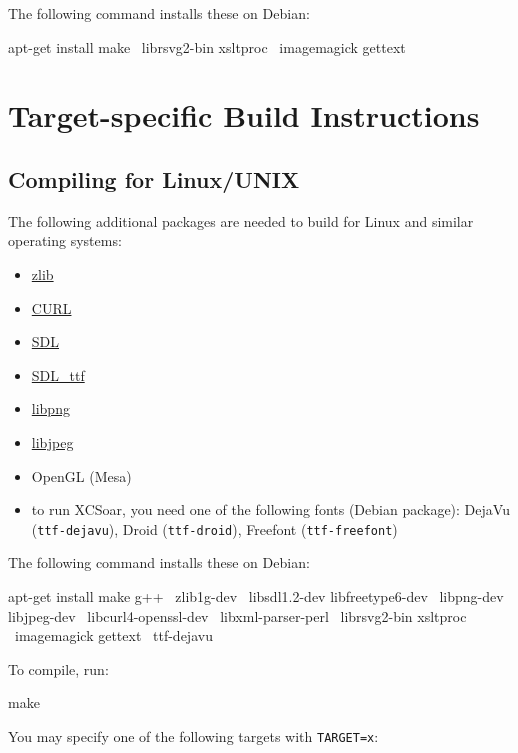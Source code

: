 The following command installs these on Debian:

\begin{verbatim*}
apt-get install make \
  librsvg2-bin xsltproc \
  imagemagick gettext
\end{verbatim*}

\section{Target-specific Build Instructions}

\subsection{Compiling for Linux/UNIX}

The following additional packages are needed to build for Linux and
similar operating systems:

\begin{itemize}
\item \href{http://www.zlib.net/}{zlib}
\item \href{http://curl.haxx.se/}{CURL}
\item \href{http://www.libsdl.org/}{SDL}
\item \href{http://www.libsdl.org/projects/SDL\_ttf/}{SDL\_ttf}
\item \href{http://www.libpng.org/}{libpng}
\item \href{http://libjpeg.sourceforge.net/}{libjpeg}
\item OpenGL (Mesa)
\item to run XCSoar, you need one of the following fonts (Debian
  package): DejaVu (\texttt{ttf-dejavu}), Droid (\texttt{ttf-droid}),
  Freefont (\texttt{ttf-freefont})
\end{itemize}

The following command installs these on Debian:

\begin{verbatim*}
apt-get install make g++ \
  zlib1g-dev \
  libsdl1.2-dev libfreetype6-dev \
  libpng-dev libjpeg-dev \
  libcurl4-openssl-dev \
  libxml-parser-perl \
  librsvg2-bin xsltproc \
  imagemagick gettext \
  ttf-dejavu
\end{verbatim*}

To compile, run:

\begin{verbatim*}
make
\end{verbatim*}

You may specify one of the following targets with \texttt{TARGET=x}:

